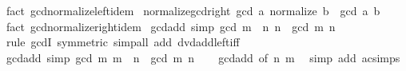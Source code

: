 \begin{isabellebody}
\isamarkupfalse%
\ {\isacharparenleft}{\kern0pt}fact\ gcd{\isachardot}{\kern0pt}normalize{\isacharunderscore}{\kern0pt}left{\isacharunderscore}{\kern0pt}idem{\isacharparenright}{\kern0pt}%
\endisatagproof
{\isafoldproof}%
%
\isadelimproof
\isanewline
%
\endisadelimproof
\isanewline
{}\isamarkupfalse%
\ normalize{\isacharunderscore}{\kern0pt}gcd{\isacharunderscore}{\kern0pt}right{\isacharcolon}{\kern0pt}\ {\isachardoublequoteopen}gcd\ a\ {\isacharparenleft}{\kern0pt}normalize\ b{\isacharparenright}{\kern0pt}\ {\isacharequal}{\kern0pt}\ gcd\ a\ b{\isachardoublequoteclose}\isanewline
%
\isadelimproof
\ \ %
\endisadelimproof
%
\isatagproof
{}\isamarkupfalse%
\ {\isacharparenleft}{\kern0pt}fact\ gcd{\isachardot}{\kern0pt}normalize{\isacharunderscore}{\kern0pt}right{\isacharunderscore}{\kern0pt}idem{\isacharparenright}{\kern0pt}%
\endisatagproof
{\isafoldproof}%
%
\isadelimproof
\isanewline
%
\endisadelimproof
\isanewline
{}\isamarkupfalse%
\ gcd{\isacharunderscore}{\kern0pt}add{}\ {\isacharbrackleft}{\kern0pt}simp{\isacharbrackright}{\kern0pt}{\isacharcolon}{\kern0pt}\ {\isachardoublequoteopen}gcd\ {\isacharparenleft}{\kern0pt}m\ {\isacharplus}{\kern0pt}\ n{\isacharparenright}{\kern0pt}\ n\ {\isacharequal}{\kern0pt}\ gcd\ m\ n{\isachardoublequoteclose}\isanewline
%
\isadelimproof
\ \ %
\endisadelimproof
%
\isatagproof
{}\isamarkupfalse%
\ {\isacharparenleft}{\kern0pt}rule\ gcdI\ {\isacharbrackleft}{\kern0pt}symmetric{\isacharbrackright}{\kern0pt}{\isacharparenright}{\kern0pt}\ {\isacharparenleft}{\kern0pt}simp{\isacharunderscore}{\kern0pt}all\ add{\isacharcolon}{\kern0pt}\ dvd{\isacharunderscore}{\kern0pt}add{\isacharunderscore}{\kern0pt}left{\isacharunderscore}{\kern0pt}iff{\isacharparenright}{\kern0pt}%
\endisatagproof
{\isafoldproof}%
%
\isadelimproof
\isanewline
%
\endisadelimproof
\isanewline
{}\isamarkupfalse%
\ gcd{\isacharunderscore}{\kern0pt}add{}\ {\isacharbrackleft}{\kern0pt}simp{\isacharbrackright}{\kern0pt}{\isacharcolon}{\kern0pt}\ {\isachardoublequoteopen}gcd\ m\ {\isacharparenleft}{\kern0pt}m\ {\isacharplus}{\kern0pt}\ n{\isacharparenright}{\kern0pt}\ {\isacharequal}{\kern0pt}\ gcd\ m\ n{\isachardoublequoteclose}\isanewline
%
\isadelimproof
\ \ %
\endisadelimproof
%
\isatagproof
{}\isamarkupfalse%
\ gcd{\isacharunderscore}{\kern0pt}add{}\ {\isacharbrackleft}{\kern0pt}of\ n\ m{\isacharbrackright}{\kern0pt}\ \isamarkupfalse%
\ {\isacharparenleft}{\kern0pt}simp\ add{\isacharcolon}{\kern0pt}\ ac{\isacharunderscore}{\kern0pt}simps{\isacharparenright}{\kern0pt}%

\end{isabellebody}
